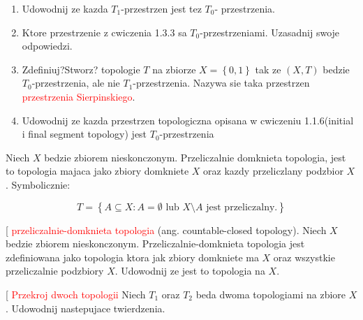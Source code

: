 \documentclass{article}
\makeatletter
\def\myitem{%
   \@ifnextchar[ \@myitem{\@noitemargtrue\@myitem[\@itemlabel]}}
\def\@myitem[#1]{\item[#1]\mbox{}\\}
\makeatother
\begin{document}
\begin{enumerate}[align=left]
        \begin{enumerate}[label=(\alph*)]
            \item Udowodnij ze kazda $T_{1}$-przestrzen jest tez $T_{0}$- przestrzenia.
            \item Ktore przestrzenie z cwiczenia 1.3.3 sa $T_{0}$-przestrzeniami. Uzasadnij swoje odpowiedzi.
            \item Zdefiniuj?Stworz? topologie $T$ na zbiorze $X = \left\{ 0,1 \right\}$ tak ze $(X,T)$ bedzie $T_{0}$-przestrzenia, ale nie $T_{1}$-przestrzenia. Nazywa sie taka przestrzen \textcolor{red}{przestrzenia Sierpinskiego}.
            \item Udowodnij ze kazda przestrzen topologiczna opisana w cwiczeniu 1.1.6(initial i final segment topology) jest $T_{0}$-przestrzenia
            
        \end{enumerate}
    
        \begin{tcolorbox}[colback=white!90!red,colframe=black!35!red,title=Definicja: Przeliczalnie-domknieta topologia(countable closed topology)]
            
            Niech $X$ bedzie zbiorem nieskonczonym. Przeliczalnie domknieta topologia, jest to topologia majaca jako zbiory domkniete $X$ oraz kazdy przeliczlany podzbior $X$. Symbolicznie:

            $$T = \left\{ A \subseteq X : A = \emptyset \text{ lub } X \setminus A \text{ jest przeliczalny.}      \right\}$$
        
        \end{tcolorbox}
    \myitem \textcolor{red}{przeliczalnie-domknieta topologia} (ang. countable-closed topology).
        Niech $X$ bedzie zbiorem nieskonczonym. Przeliczalnie-domknieta topologia jest zdefiniowana jako topologia ktora jak zbiory domkniete ma $X$ oraz wszystkie przeliczalnie podzbiory $X$. Udowodnij ze jest to topologia na $X$.
         
        \myitem \textcolor{red}{Przekroj dwoch topologii}
        Niech $T_{1}$ oraz $T_{2}$ beda dwoma topologiami na zbiore $X$. Udowodnij nastepujace twierdzenia.


\end{enumerate}
\end{document}
